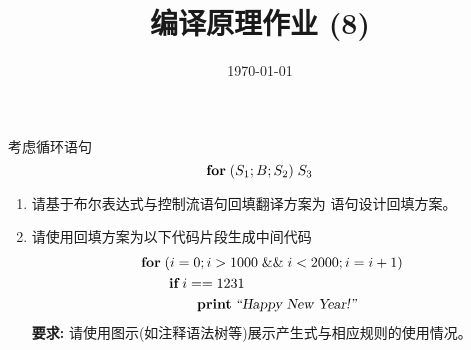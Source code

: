 \documentclass[a4paper, justified]{tufte-handout}
\title{编译原理作业 (8)}
\date{\today}
\begin{document}
\maketitle
\noplagiarism %
\begin{abstract}
\end{abstract}
\beginrequired

\begin{problem}[\score{10 = 5 + 5}]
  考虑循环语句
  \[
    \text{\bf for} \;(S_{1}; B; S_{2})\; S_{3}
  \]
  \begin{enumerate}[(1)]
    \item 请基于布尔表达式与控制流语句回填翻译方案为 \forkw{} 语句设计回填方案。
    \item 请使用回填方案为以下代码片段生成中间代码
      \begin{align*}
        &\text{\bf for}\; (i = 0; i > 1000 \;\&\&\; i < 2000; i = i + 1) \\
          &\qquad \text{\bf if}\; i == 1231\; \\
          &\qquad\qquad \text{\bf print}\; {\textsl{``Happy New Year!''}}
      \end{align*}
      {\bf 要求:} 请使用图示(如注释语法树等)展示产生式与相应规则的使用情况。
  \end{enumerate}
\end{problem}
\end{document}
